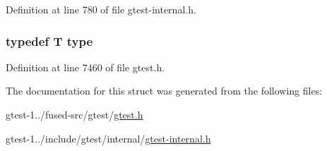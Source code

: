 \-Definition at line 780 of file gtest-\/internal.\-h.

\hypertarget{structtesting_1_1internal_1_1RemoveReference_a565429e62c1d4fd084335146ba778e17}{
\subsubsection[{type}]{\setlength{\rightskip}{0pt plus 5cm}typedef \-T {\bf type}}}\label{d6/da7/structtesting_1_1internal_1_1RemoveReference_a565429e62c1d4fd084335146ba778e17}


\-Definition at line 7460 of file gtest.\-h.



\-The documentation for this struct was generated from the following files\-:\begin{DoxyCompactItemize}
\item 
gtest-\/1../fused-\/src/gtest/\hyperlink{fused-src_2gtest_2gtest_8h}{gtest.\-h}\item 
gtest-\/1../include/gtest/internal/\hyperlink{gtest-internal_8h}{gtest-\/internal.\-h}\end{DoxyCompactItemize}
